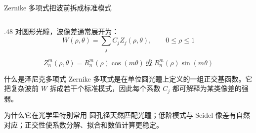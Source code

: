 \begin{frame}{Zernike 多项式把波前拆成标准模式}\label{1.8}
    \begin{columns}[T]
        \begin{column}{.48\textwidth}
            \scriptsize
            对圆形光瞳，波像差通常展开为：
            \begin{equation}
                W(\rho,\theta)=\sum_j C_j Z_j(\rho,\theta),
                \qquad 0\le \rho \le 1
                \label{eq:zernike_main}
            \end{equation}

            \begin{equation}
                Z_n^m(\rho,\theta)
                =R_n^m(\rho)\cos(m\theta)
                \ \text{或}\
                R_n^m(\rho)\sin(m\theta)
                \label{eq:zernike_nm_main}
            \end{equation}

            \begin{block}{什么是泽尼克多项式}
                Zernike 多项式是在\alert{单位圆光瞳}上定义的一组正交基函数。它把复杂波前 $W$ 拆成若干个标准模式，因此每个系数 $C_j$ 都可解释为某类像差的强弱。
            \end{block}

            \vspace{-2pt}
            \begin{block}{为什么它在光学里特别常用}
                圆孔径天然匹配光瞳；低阶模式与 Seidel 像差有自然对应；正交性使系数分解、拟合和数值计算更稳定。
            \end{block}


\end{column}
\end{columns}
\end{frame}
